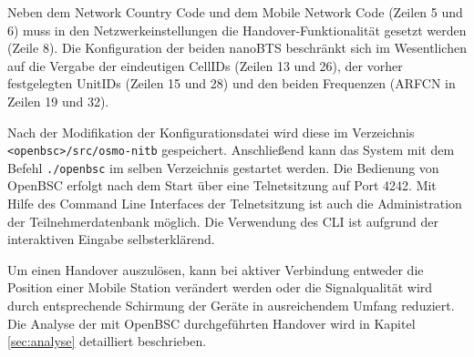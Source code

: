 Neben dem Network Country Code und dem Mobile Network Code (Zeilen 5 und 6) muss in den Netzwerkeinstellungen die Handover-Funktionalität gesetzt werden (Zeile 8). Die Konfiguration der beiden nanoBTS beschränkt sich im Wesentlichen auf die Vergabe der eindeutigen CellIDs (Zeilen 13 und 26), der vorher festgelegten UnitIDs (Zeilen 15 und 28) und den beiden Frequenzen (ARFCN in Zeilen 19 und 32).

Nach der Modifikation der Konfigurationsdatei wird diese im Verzeichnis \lstinline{<openbsc>/src/osmo-nitb} gespeichert. Anschließend kann das System mit dem Befehl \lstinline{./openbsc} im selben Verzeichnis gestartet werden. Die Bedienung von OpenBSC erfolgt nach dem Start über eine Telnetsitzung auf Port 4242. Mit Hilfe des Command Line Interfaces der Telnetsitzung ist auch die Administration der Teilnehmerdatenbank möglich. Die Verwendung des CLI ist aufgrund der interaktiven Eingabe selbsterklärend.

Um einen Handover auszulösen, kann bei aktiver Verbindung entweder die Position einer Mobile Station verändert werden oder die Signalqualität wird durch entsprechende Schirmung der Geräte in ausreichendem Umfang reduziert. Die Analyse der mit OpenBSC durchgeführten Handover wird in Kapitel \ref{sec:analyse} detailliert beschrieben.
